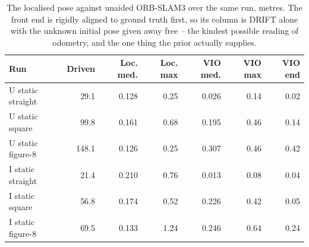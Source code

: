\begin{table}[htbp]
\centering\small
\caption{The localised pose against unaided ORB-SLAM3 over the same run, metres. The front end is rigidly aligned to ground truth first, so its column is DRIFT alone with the unknown initial pose given away free -- the kindest possible reading of odometry, and the one thing the prior actually supplies.}
\label{tab:insight4nav-prior}
\begin{tabular}{lrrrrrr}
\toprule
Run & Driven & Loc. med. & Loc. max & VIO med. & VIO max & VIO end \\
\midrule
U static straight & 29.1 & 0.128 & 0.25 & 0.026 & 0.14 & 0.02 \\
U static square & 99.8 & 0.161 & 0.68 & 0.195 & 0.46 & 0.14 \\
U static figure-8 & 148.1 & 0.126 & 0.25 & 0.307 & 0.46 & 0.42 \\
I static straight & 21.4 & 0.210 & 0.76 & 0.013 & 0.08 & 0.04 \\
I static square & 56.8 & 0.174 & 0.52 & 0.226 & 0.42 & 0.05 \\
I static figure-8 & 69.5 & 0.133 & 1.24 & 0.246 & 0.64 & 0.24 \\
\bottomrule
\end{tabular}
\end{table}
